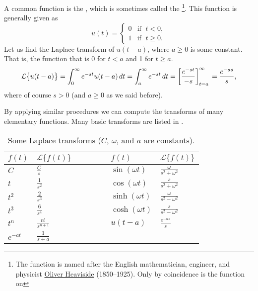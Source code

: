 \begin{example}
A common function is the \emph{}, which is
sometimes called the \emph{}%
\footnote{The function is named after the English mathematician, engineer, and
physicist
\href{https://en.wikipedia.org/wiki/Heaviside}{Oliver Heaviside}
(1850--1925).  Only
by coincidence is the function  on }.
This function is generally given as
\begin{equation*}
u(t) = 
\begin{cases}
0 & \text{if } \; t < 0 , \\
1 & \text{if } \; t \geq 0 .
\end{cases}
\end{equation*}
Let us find the Laplace transform of $u(t-a)$, where $a \geq 0$
is some constant.
That is, the function that is 0 for $t < a$ and 1 for $t \geq a$.
\begin{equation*}
\mathcal{L} \bigl\{ u(t-a) \bigr\}
=
\int_0^{\infty} e^{-st} u(t-a) \, dt
=
\int_a^{\infty} e^{-st} \, dt
=
\left[ \frac{e^{-st}}{-s} \right]_{t=a}^\infty \\
=
\frac{e^{-as}}{s} ,
\end{equation*}
where of course $s > 0$ (and $a \geq 0$ as we said before).
\end{example}

By applying similar procedures we can compute the transforms of many
elementary functions.  Many basic transforms are listed in
.

\begin{table}[h!t]
\mybeginframe
\capstart
\begin{center}
\begin{tabular}{@{}lllll@{}}
\toprule
$f(t)$ & $\mathcal{L} \bigl\{ f(t) \bigr\}$ & $\qquad\quad$ &
$f(t)$ & $\mathcal{L} \bigl\{ f(t) \bigr\}$ \\
\midrule
$C$ & $\frac{C}{s}$
& &
$\sin (\omega t)$ & $\frac{\omega}{s^2+\omega^2}$
\\[4pt]
$t$ & $\frac{1}{s^2}$
& &
$\cos (\omega t)$ & $\frac{s}{s^2+\omega^2}$
\\[4pt]
$t^2$ & $\frac{2}{s^3}$
& &
$\sinh (\omega t)$ & $\frac{\omega}{s^2-\omega^2}$
\\[4pt]
$t^3$ & $\frac{6}{s^4}$
& &
$\cosh (\omega t)$ & $\frac{s}{s^2-\omega^2}$
\\[4pt]
$t^n$ & $\frac{n!}{s^{n+1}}$
& &
$u(t-a)$ & $\frac{e^{-as}}{s}$
\\[4pt]
$e^{-at}$ & $\frac{1}{s+a}$
& & &
\\[4pt]
\bottomrule
\end{tabular}
\end{center}
\caption{Some Laplace transforms ($C$, $\omega$, and $a$ are
constants).\label{lt:table}}
\myendframe
\end{table}

